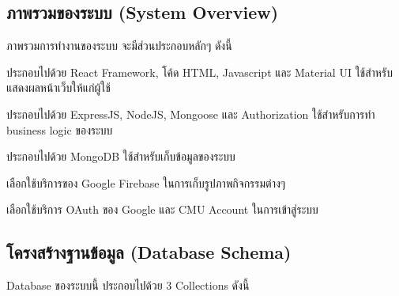 \subsection{ภาพรวมของระบบ (System Overview)}
ภาพรวมการทำงานของระบบ จะมีส่วนประกอบหลักๆ ดังนี้

ประกอบไปด้วย React Framework, โค้ด HTML, Javascript และ Material UI ใช้สำหรับแสดงผลหน้าเว็บให้แก่ผู้ใช้

ประกอบไปด้วย ExpressJS, NodeJS, Mongoose และ Authorization ใช้สำหรับการทำ business logic ของระบบ

ประกอบไปด้วย MongoDB ใช้สำหรับเก็บข้อมูลของระบบ

เลือกใช้บริการของ Google Firebase ในการเก็บรูปภาพกิจกรรมต่างๆ

เลือกใช้บริการ OAuth ของ Google และ CMU Account ในการเข้าสู่ระบบ
\clearpage

\subsection{โครงสร้างฐานข้อมูล (Database Schema)}
Database ของระบบนี้ ประกอบไปด้วย 3 Collections ดังนี้

